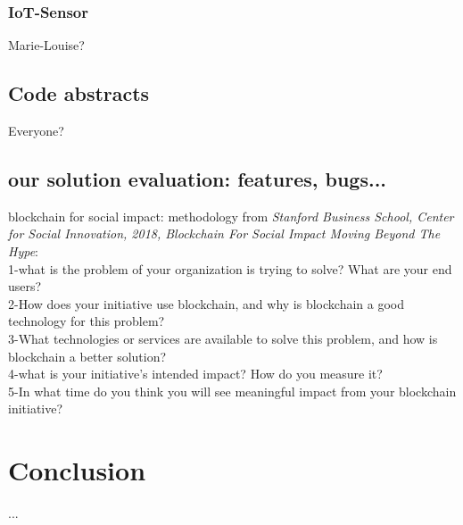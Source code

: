\documentclass[11pt]{article}
\begin{document}
\subsubsection{IoT-Sensor}
Marie-Louise?

\subsection{Code abstracts}
Everyone?

\subsection{our solution evaluation: features, bugs...}
blockchain for social impact: methodology from \textit{Stanford Business School, Center for Social Innovation, 2018, Blockchain For Social Impact Moving Beyond The Hype}:\\
1-what is the problem of your organization is trying to solve? What are your end users?\\
2-How does your initiative use blockchain, and why is blockchain a good technology for this problem?\\
3-What technologies or services are available to solve this problem, and how is blockchain a better solution?\\
4-what is your initiative's intended impact? How do you measure it?\\
5-In what time do you think you will see meaningful impact from your blockchain initiative?\\

\section{Conclusion}
...
\end{document}
